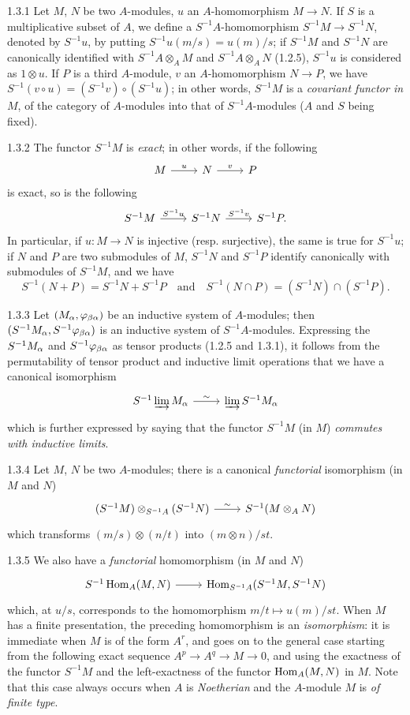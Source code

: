 \documentclass[../main.tex]{subfiles}
\begin{document}
\begin{cx}{1.3.1}
Let $M$, $N$ be two $A$-modules, $u$ an $A$-homomorphism $M\to N$. If $S$ is a multiplicative subset of $A$,
we define a $S^{-1}A$-homomorphism $S^{-1}M\to S^{-1}N$, denoted by $S^{-1}u$, by putting
$S^{-1}u(m/s)=u(m)/s$; if $S^{-1}M$ and $S^{-1}N$ are canonically identified with $S^{-1}A\otimes_A M$ and
$S^{-1}A\otimes_A N$ (1.2.5), $S^{-1}u$ is considered as $1\otimes u$. If $P$ is a third $A$-module,
$v$ an $A$-homomorphism $N\to P$, we have $S^{-1}(v\circ u)=(S^{-1}v)\circ(S^{-1}u)$; in other words,
$S^{-1}M$ is a \emph{covariant functor in} $M$, of the category of $A$-modules into that of $S^{-1}A$-modules
($A$ and $S$ being fixed).
\end{cx}

\begin{cx}{1.3.2}
The functor $S^{-1}M$ is \emph{exact}; in other words, if the following
\[\TI
  M\ar[r,"u"] & N\ar[r,"v"] & P
\TE\]
is exact, so is the following
\[\TI
  S^{-1}M\ar[r,"S^{-1}u"] & S^{-1}N\ar[r,"S^{-1}v"] & S^{-1}P.
\TE\]
In particular, if $u:M\to N$ is injective (resp. surjective), the same is true for $S^{-1}u$;
 if $N$ and $P$ are two
submodules of $M$, $S^{-1}N$ and $S^{-1}P$ identify canonically with submodules of $S^{-1}M$, and we have
\[
  S^{-1}(N+P)=S^{-1}N+S^{-1}P\quad\text{and}\quad S^{-1}(N\cap P)=(S^{-1}N)\cap(S^{-1}P).
\]
\end{cx}

\begin{cx}{1.3.3}
Let $(M_\alpha,\varphi_{\beta\alpha})$ be an inductive system of $A$-modules; then
$(S^{-1}M_\alpha,S^{-1}\varphi_{\beta\alpha})$ is an inductive system of $S^{-1}A$-modules.
Expressing the $S^{-1}M_\alpha$ and $S^{-1}\varphi_{\beta\alpha}$ as tensor products (1.2.5 and 1.3.1),
it follows from the permutability of tensor product and inductive limit operations that we have a canonical isomorphism
\[\TI
  S^{-1}\varinjlim M_\a\ar[r,"\sim"] &\varinjlim S^{-1} M_\a
\TE\]
which is further expressed by saying that the functor $S^{-1}M$ (in $M$) \emph{commutes with inductive limits}.
\end{cx}

\begin{cx}{1.3.4}
Let $M$, $N$ be two $A$-modules; there is a canonical \emph{functorial} isomorphism (in $M$ and $N$)
\[\TI
  (S^{-1}M)\otimes_{S^{-1}A}(S^{-1}N)\ar[r,"\sim"] &S^{-1}(M\otimes_A N)
\TE\]
which transforms $(m/s)\otimes(n/t)$ into $(m\otimes n)/st$.
\end{cx}

\begin{cx}{1.3.5}
We also have a \emph{functorial} homomorphism (in $M$ and $N$)
\[\TI
  S^{-1}\Hom_A(M,N)\ar[r] &\Hom_{S^{-1}A}(S^{-1}M,S^{-1}N)
\TE\]
which, at $u/s$, corresponds to the homomorphism $m/t\mapsto u(m)/st$. When $M$ has a finite presentation, the
preceding homomorphism is an \emph{isomorphism}: it is immediate when $M$ is of the form $A^r$, and goes on to the general
case starting from the following exact sequence $A^p\to A^q\to M\to 0$, and using the exactness of the functor $S^{-1}M$ and
the left-exactness of the functor $\operatorname*{Hom}_A(M,N)$ in $M$. Note that this case always occurs when $A$ is \emph{Noetherian} and the
$A$-module $M$ is \emph{of finite type}.
\end{cx}
\end{document}
